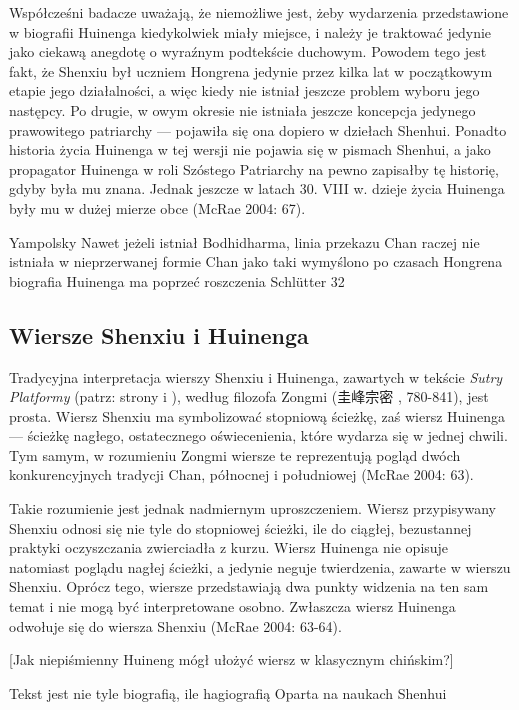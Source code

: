 Współcześni badacze uważają, że niemożliwe jest, żeby wydarzenia przedstawione w biografii Huinenga kiedykolwiek miały miejsce, i należy je traktować jedynie jako ciekawą anegdotę o wyraźnym podtekście duchowym. Powodem tego jest fakt, że Shenxiu był uczniem Hongrena jedynie przez kilka lat w początkowym etapie jego działalności, a więc kiedy nie istniał jeszcze problem wyboru jego następcy. Po drugie, w owym okresie nie istniała jeszcze koncepcja jedynego prawowitego patriarchy --- pojawiła się ona dopiero w dziełach Shenhui. Ponadto historia życia Huinenga w tej wersji nie pojawia się w pismach Shenhui, a jako propagator Huinenga w roli Szóstego Patriarchy na pewno zapisałby tę historię, gdyby była mu znana. Jednak jeszcze w latach 30. VIII w. dzieje życia Huinenga były mu w dużej mierze obce (McRae 2004: 67).

Yampolsky
Nawet jeżeli istniał Bodhidharma, linia przekazu Chan raczej nie istniała w nieprzerwanej formie
Chan jako taki wymyślono po czasach Hongrena
biografia Huinenga ma poprzeć roszczenia
Schlütter 32
\fi

\subsection{Wiersze Shenxiu i Huinenga}
Tradycyjna interpretacja wierszy Shenxiu i Huinenga, zawartych w tekście \textit{Sutry Platformy} (patrz: strony \pageref{ShenxiuVerse} i \pageref{HuinengVerse}), według filozofa Zongmi (圭峰宗密 , 780-841), jest prosta. Wiersz Shenxiu ma symbolizować stopniową ścieżkę, zaś wiersz Huinenga --- ścieżkę nagłego, ostatecznego oświecenienia, które wydarza się w jednej chwili. Tym samym, w rozumieniu Zongmi wiersze te reprezentują pogląd dwóch konkurencyjnych tradycji Chan, północnej i południowej (McRae 2004: 63).

Takie rozumienie jest jednak nadmiernym uproszczeniem. Wiersz przypisywany Shenxiu odnosi się nie tyle do stopniowej ścieżki, ile do ciągłej, bezustannej praktyki oczyszczania zwierciadła z kurzu. Wiersz Huinenga nie opisuje natomiast poglądu nagłej ścieżki, a jedynie neguje twierdzenia, zawarte w wierszu Shenxiu. Oprócz tego, wiersze przedstawiają dwa punkty widzenia na ten sam temat i nie mogą być interpretowane osobno. Zwłaszcza wiersz Huinenga odwołuje się do wiersza Shenxiu (McRae 2004: 63-64).

[Jak niepiśmienny Huineng mógł ułożyć wiersz w klasycznym chińskim?]

Tekst jest nie tyle biografią, ile hagiografią
Oparta na naukach Shenhui

